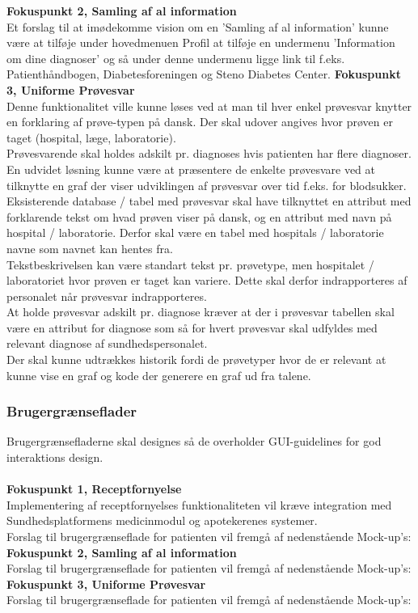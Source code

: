 \textbf{Fokuspunkt 2, Samling af al information} \\
 Et forslag til at imødekomme vision om en 'Samling af al information' kunne være at tilføje under hovedmenuen Profil at tilføje en undermenu 'Information om dine diagnoser' og så under denne undermenu ligge link til f.eks. Patienthåndbogen, Diabetesforeningen og Steno Diabetes Center. 
 \textbf{Fokuspunkt 3, Uniforme Prøvesvar} \\
 Denne funktionalitet ville kunne løses ved at man til hver enkel prøvesvar knytter en forklaring af prøve-typen på dansk. Der skal udover angives hvor prøven er taget (hospital, læge, laboratorie).\\
 Prøvesvarende skal holdes adskilt pr. diagnoses hvis patienten har flere diagnoser.\\
 En udvidet løsning kunne være at præsentere de enkelte prøvesvare ved at tilknytte en graf der viser udviklingen af prøvesvar over tid f.eks. for blodsukker.\\
 Eksisterende database / tabel med prøvesvar skal have tilknyttet en attribut med forklarende tekst om hvad prøven viser på dansk, og en attribut med navn på hospital / laboratorie. Derfor skal være en tabel med hospitals / laboratorie navne som navnet kan hentes fra.\\ 
 Tekstbeskrivelsen kan være standart tekst pr. prøvetype, men hospitalet / laboratoriet hvor prøven er taget kan variere. Dette skal derfor indrapporteres af personalet når prøvesvar indrapporteres. \\
 At holde prøvesvar adskilt pr. diagnose kræver at der i prøvesvar tabellen skal være en attribut for diagnose som så for hvert prøvesvar skal udfyldes med relevant diagnose af sundhedspersonalet.\\
 Der skal kunne udtrækkes historik fordi de prøvetyper hvor de er relevant at kunne vise en graf og kode der generere en graf ud fra talene.
 \subsubsection{Brugergrænseflader} %
 Brugergrænsefladerne skal designes så de overholder GUI-guidelines for god interaktions design. %
 \\\\
 \textbf{Fokuspunkt 1, Receptfornyelse} \\
 Implementering af receptfornyelses funktionaliteten vil kræve integration med Sundhedsplatformens medicinmodul og apotekerenes systemer.\\ 
 Forslag til brugergrænseflade for patienten vil fremgå af nedenstående Mock-up's:\\
 \textbf{Fokuspunkt 2, Samling af al information} \\
 Forslag til brugergrænseflade for patienten vil fremgå af nedenstående Mock-up's:\\
 \textbf{Fokuspunkt 3, Uniforme Prøvesvar} \\
 Forslag til brugergrænseflade for patienten vil fremgå af nedenstående Mock-up's:\\
